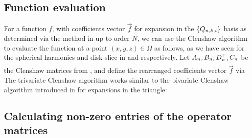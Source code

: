 \subsection{Function evaluation}\label{section:sc:functionevaluation}

For a function $f$, with coefficients vector $\vec{f}$ for expansion in the $\{Q_{n,k,i}\}$ basis as determined via the method in  up to order $N$, we can use the Clenshaw algorithm to evaluate the function at a point $(x,y,z) \in \Omega$ as follows, as we have seen for the spherical harmonics and disk-slice in  and  respectively. Let $A_n, B_n, D^\top_n, C_n$ be the Clenshaw matrices from , and define the rearranged coefficients vector $\tilde{\vec{f}}$ via
The trivariate Clenshaw algorithm works similar to the bivariate Clenshaw algorithm introduced in \cite{olver2019triangle} for expansions in the triangle:


\subsection{Calculating non-zero entries of the operator matrices}\label{section:sc:Computation-operatormatrices}

